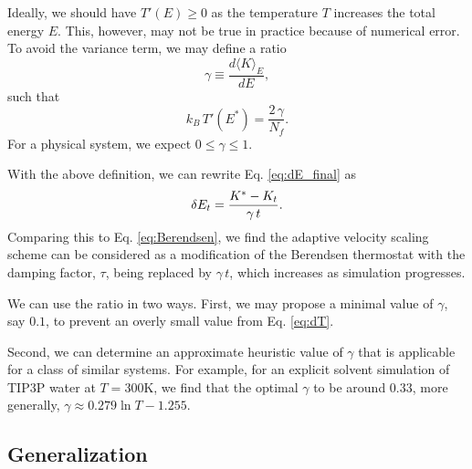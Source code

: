\documentclass[reprint]{revtex4-1}
\begin{document}
Ideally, we should have $T'(E) \ge 0$
as the temperature $T$ increases the total energy $E$.
%
This, however, may not be true in practice
because of numerical error.
%
%
To avoid the variance term,
we may define a ratio
%
\begin{equation}
  \gamma
  \equiv
  \frac
  {
    d \langle K \rangle_E
  }
  {
    dE
  }
  ,
  \label{eq:gamma_def}
\end{equation}
%
such that
%
\begin{equation}
  k_B \, T'(E^*)
  =
  \frac{ 2 \, \gamma } { N_f }
  .
  \label{eq:dT_approx}
\end{equation}
%
For a physical system, we expect $0 \le \gamma \le 1$.
%

With the above definition, we can rewrite Eq. \eqref{eq:dE_final} as
%
\begin{equation}
  \delta E_t
  =
  \frac{ K^* - K_t } { \gamma \, t }
  .
  \notag
\end{equation}
%
Comparing this to Eq. \eqref{eq:Berendsen},
we find the adaptive velocity scaling scheme
can be considered as a modification of the Berendsen thermostat
with the damping factor, $\tau$, being replaced by $\gamma \, t$,
which increases as simulation progresses.


We can use the ratio in two ways.
%
First, we may propose a minimal value of $\gamma$, say $0.1$,
to prevent an overly small value from Eq. \eqref{eq:dT}.

Second,
we can determine an approximate heuristic value of $\gamma$
that is applicable for a class of similar systems.
%
For example,
for an explicit solvent simulation of TIP3P water\cite{jorgensen1983}
at $T = 300\mathrm K$, we find that the optimal $\gamma$
to be around $0.33$,
more generally, $\gamma \approx 0.279\ln T - 1.255$.


\subsection{Generalization}
\end{document}
